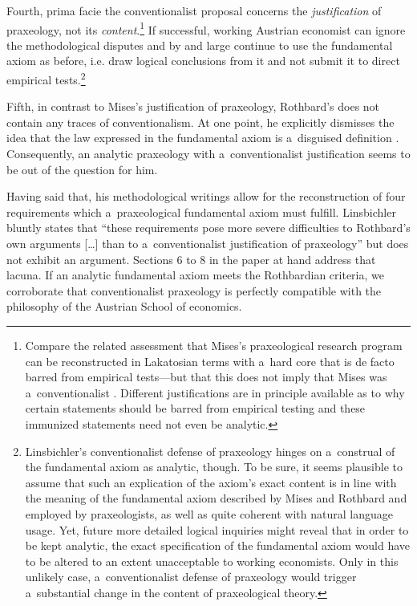 Fourth, prima facie the conventionalist proposal concerns the \textit{justification} of praxeology, not its \textit{content}.\footnote{Compare the related assessment that Mises's praxeological research program can be reconstructed in Lakatosian terms with a~hard core that is de facto barred from empirical tests---but that this does not imply that Mises was a~conventionalist 
\parencite[see][]{zanotti_can_2022}. %
 Different justifications are in principle available as to why certain statements should be barred from empirical testing and these immunized statements need not even be analytic.} If successful, working Austrian economist can ignore the methodological disputes and by and large continue to use the fundamental axiom as before, i.e. draw logical conclusions from it and not submit it to direct empirical tests.\footnote{Linsbichler's 
\parencites*[][]{}[][]{} %
 conventionalist defense of praxeology hinges on a~construal of the fundamental axiom as analytic, though. To be sure, it seems plausible to assume that such an explication of the axiom's exact content is in line with the meaning of the fundamental axiom described by Mises and Rothbard and employed by praxeologists, as well as quite coherent with natural language usage. Yet, future more detailed logical inquiries might reveal that in order to be kept analytic, the exact specification of the fundamental axiom would have to be altered to an extent unacceptable to working economists. Only in this unlikely case, a~conventionalist defense of praxeology would trigger a~substantial change in the content of praxeological theory.}



Fifth, in contrast to Mises's justification of praxeology, Rothbard's does not contain any traces of conventionalism. At one point, he explicitly dismisses the idea that the law expressed in the fundamental axiom is a~disguised definition 
\parencite[][p.318]{rothbard_defense_1957}. %
 Consequently, an analytic praxeology with a~conventionalist justification seems to be out of the question for him.



Having said that, his methodological writings allow for the reconstruction of four requirements which a~praxeological fundamental axiom must fulfill. Linsbichler 
\parencite*[][p.3376]{linsbichler_austrian_2021} %
 bluntly states that ``these requirements pose more severe difficulties to Rothbard's own arguments […] than to a~conventionalist justification of praxeology'' but does not exhibit an argument. Sections 6 to 8 in the paper at hand address that lacuna. If an analytic fundamental axiom meets the Rothbardian criteria, we corroborate that conventionalist praxeology is perfectly compatible with the philosophy of the Austrian School of economics.



